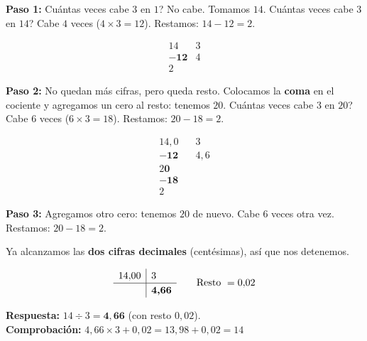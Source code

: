 \documentclass[12pt, letterpaper]{article}
\begin{document}
\begin{cuadrosolucion}
  \textbf{Paso 1:} \textquestiondown Cuántas veces cabe $3$ en $1$? No cabe. Tomamos $14$. \textquestiondown Cuántas veces cabe $3$ en $14$? Cabe $4$ veces ($4 \times 3 = 12$). Restamos: $14 - 12 = 2$.

  \[
    \renewcommand{\arraystretch}{1.2}
    \begin{array}{r|l}
      14           & 3 \\ \hline
      \mathbf{-12} & 4 \\
      2            &
    \end{array}
  \]

  \textbf{Paso 2:} No quedan más cifras, pero queda resto. Colocamos la \textbf{coma} en el cociente y agregamos un cero al resto: tenemos $20$. \textquestiondown Cuántas veces cabe $3$ en $20$? Cabe $6$ veces ($6 \times 3 = 18$). Restamos: $20 - 18 = 2$.

  \[
    \renewcommand{\arraystretch}{1.2}
    \begin{array}{r|l}
      14{,}0                     & 3     \\ \hline
      \mathbf{-12}\phantom{{,}0} & 4{,}6 \\
      2\mathbf{0}\phantom{}      &       \\
      \mathbf{-18}\phantom{}     &       \\
      2\phantom{}                &
    \end{array}
  \]

  \textbf{Paso 3:} Agregamos otro cero: tenemos $20$ de nuevo. Cabe $6$ veces otra vez. Restamos: $20 - 18 = 2$.

  Ya alcanzamos las \textbf{dos cifras decimales} (centésimas), así que nos detenemos.

  \[
    \renewcommand{\arraystretch}{1.2}
    \begin{array}{r|l}
      14{,}00 & 3                   \\ \hline
              & \boldsymbol{4{,}66} \\
    \end{array}
    \qquad \text{Resto } = 0{,}02
  \]

  \textbf{Respuesta:} $14 \div 3 = \boldsymbol{4{,}66}$ (con resto $0{,}02$).\\
  \textbf{Comprobación:} $4{,}66 \times 3 + 0{,}02 = 13{,}98 + 0{,}02 = 14$ \checkmark
\end{cuadrosolucion}

\newpage
\end{document}
